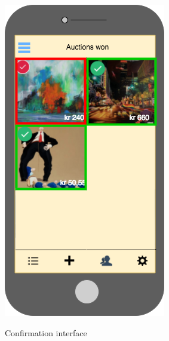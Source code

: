 \begin{figure}[H]
  \hspace{1cm}
  \begin{minipage}[b]{0.31\linewidth}
    \caption{Confirmation interface}
    \includegraphics[width=\linewidth]{Appendix/HorizontalPrototype/4.png}
    \label{ConfirmationInterface}
  \end{minipage}
\end{figure}

